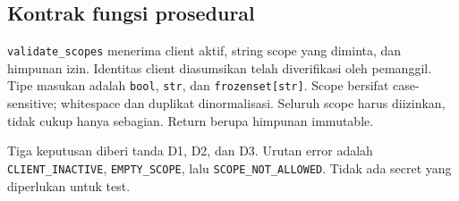\documentclass[11pt,a4paper]{article}
\begin{document}
\subsection{Kontrak fungsi prosedural}
\texttt{validate\_scopes} menerima client aktif, string scope yang diminta,
dan himpunan izin. Identitas client diasumsikan telah diverifikasi oleh
pemanggil. Tipe masukan adalah \texttt{bool}, \texttt{str}, dan
\texttt{frozenset[str]}. Scope bersifat case-sensitive; whitespace dan
duplikat dinormalisasi. Seluruh scope harus diizinkan, tidak cukup hanya
sebagian. Return berupa himpunan immutable.



Tiga keputusan diberi tanda D1, D2, dan D3. Urutan error adalah
\texttt{CLIENT\_INACTIVE}, \texttt{EMPTY\_SCOPE}, lalu
\texttt{SCOPE\_NOT\_ALLOWED}. Tidak ada secret yang diperlukan untuk test.

\newpage
\end{document}
